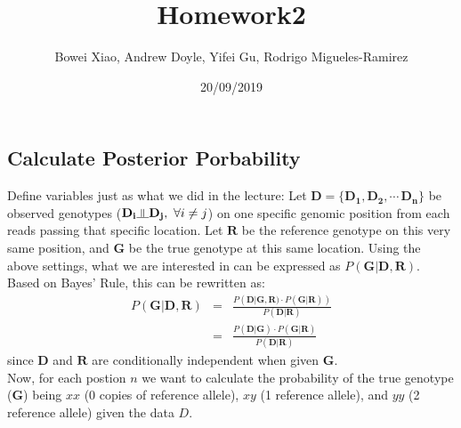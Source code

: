 \documentclass[]{article}
\title{Homework2}
\author{Bowei Xiao, Andrew Doyle, Yifei Gu, Rodrigo Migueles-Ramirez}
\date{20/09/2019}
\begin{document}
\maketitle

\newcommand{\indep}{\rotatebox[origin=c]{90}{$\models$}}

\hypertarget{calculate-posterior-porbability}{%
\subsection{Calculate Posterior
Porbability}\label{calculate-posterior-porbability}}

Define variables just as what we did in the lecture: Let
\(\mathbf{D}=\{\mathbf{D_1},\mathbf{D_2},\cdots\,\mathbf{D_n}\}\) be
observed genotypes
(\(\mathbf{D_i}\rotatebox[origin=c]{90}{$\models$}\mathbf{D_j},\ \forall i\ne j\))
on one specific genomic position from each reads passing that specific
location. Let \(\mathbf{R}\) be the reference genotype on this very same
position, and \(\mathbf{G}\) be the true genotype at this same location.
Using the above settings, what we are interested in can be expressed as
\(P(\mathbf{G|D,R})\). Based on Bayes' Rule, this can be rewritten as:
\begin{eqnarray*}
P(\mathbf{G|D,R})&=&\frac{P(\mathbf{D|G,R)}\cdot P(\mathbf{G|R}))}{P(\mathbf{D|R})} \\
&=& \frac{P(\mathbf{D|G})\cdot P(\mathbf{G|R})}{P(\mathbf{D|R})}
\end{eqnarray*} since \(\mathbf{D}\) and \(\mathbf{R}\) are
conditionally independent when given \(\mathbf{G}\).\\
Now, for each postion \(n\) we want to calculate the probability of the
true genotype (\(\mathbf{G}\)) being \(xx\) (0 copies of reference
allele), \(xy\) (1 reference allele), and \(yy\) (2 reference allele)
given the data \(D\).
\end{document}
